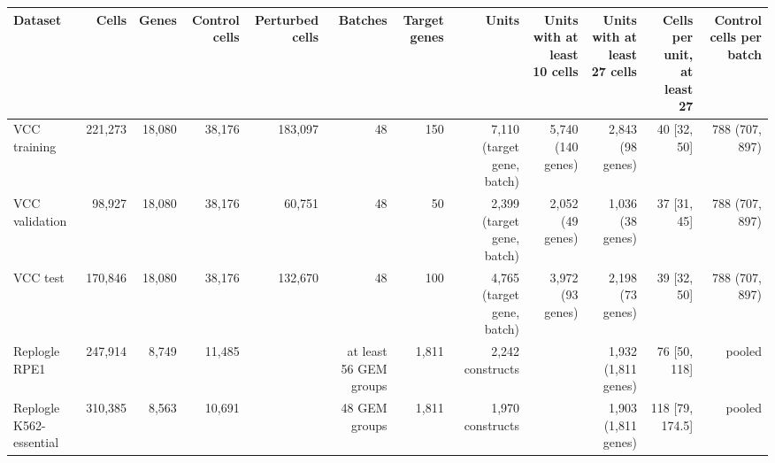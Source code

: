 \begin{tabular}{lrrrrrrrrrrr}
\toprule
Dataset & Cells & Genes & Control cells & Perturbed cells & Batches & Target genes & Units & Units with at least 10 cells & Units with at least 27 cells & Cells per unit, at least 27 & Control cells per batch \\
\midrule
VCC training & 221,273 & 18,080 & 38,176 & 183,097 & 48 & 150 & 7,110 (target gene, batch) & 5,740 (140 genes) & 2,843 (98 genes) & 40 [32, 50] & 788 (707, 897) \\
VCC validation & 98,927 & 18,080 & 38,176 & 60,751 & 48 & 50 & 2,399 (target gene, batch) & 2,052 (49 genes) & 1,036 (38 genes) & 37 [31, 45] & 788 (707, 897) \\
VCC test & 170,846 & 18,080 & 38,176 & 132,670 & 48 & 100 & 4,765 (target gene, batch) & 3,972 (93 genes) & 2,198 (73 genes) & 39 [32, 50] & 788 (707, 897) \\
Replogle RPE1 & 247,914 & 8,749 & 11,485 &  & at least 56 GEM groups & 1,811 & 2,242 constructs &  & 1,932 (1,811 genes) & 76 [50, 118] & pooled \\
Replogle K562-essential & 310,385 & 8,563 & 10,691 &  & 48 GEM groups & 1,811 & 1,970 constructs &  & 1,903 (1,811 genes) & 118 [79, 174.5] & pooled \\
\bottomrule
\end{tabular}
